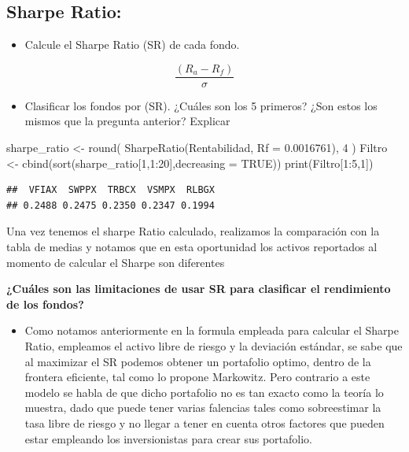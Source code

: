 \documentclass[
  12pt,
]{article}
\newenvironment{Shaded}{\begin{snugshade}}{\end{snugshade}}
\newcommand{\AttributeTok}[1]{\textcolor[rgb]{0.77,0.63,0.00}{#1}}
\newcommand{\ConstantTok}[1]{\textcolor[rgb]{0.00,0.00,0.00}{#1}}
\newcommand{\DecValTok}[1]{\textcolor[rgb]{0.00,0.00,0.81}{#1}}
\newcommand{\FloatTok}[1]{\textcolor[rgb]{0.00,0.00,0.81}{#1}}
\newcommand{\FunctionTok}[1]{\textcolor[rgb]{0.00,0.00,0.00}{#1}}
\newcommand{\NormalTok}[1]{#1}
\newcommand{\OtherTok}[1]{\textcolor[rgb]{0.56,0.35,0.01}{#1}}
\newcommand{\SpecialCharTok}[1]{\textcolor[rgb]{0.00,0.00,0.00}{#1}}
\providecommand{\tightlist}{%
  \setlength{\itemsep}{0pt}\setlength{\parskip}{0pt}}
\begin{document}
\hypertarget{sharpe-ratio}{%
\subsection{Sharpe Ratio:}\label{sharpe-ratio}}

\begin{itemize}
\tightlist
\item
  Calcule el Sharpe Ratio (SR) de cada fondo.
\end{itemize}

\[
\frac{(R_{a}-R_{f})}{\sigma }
\]

\begin{itemize}
\tightlist
\item
  Clasificar los fondos por (SR). ¿Cuáles son los 5 primeros? ¿Son estos
  los mismos que la pregunta anterior? Explicar
\end{itemize}

\begin{Shaded}
\begin{Highlighting}[]
\NormalTok{sharpe\_ratio }\OtherTok{\textless{}{-}} \FunctionTok{round}\NormalTok{(}
  \FunctionTok{SharpeRatio}\NormalTok{(Rentabilidad, }\AttributeTok{Rf =} \FloatTok{0.0016761}\NormalTok{), }\DecValTok{4}
\NormalTok{)}
\NormalTok{Filtro }\OtherTok{\textless{}{-}} \FunctionTok{cbind}\NormalTok{(}\FunctionTok{sort}\NormalTok{(sharpe\_ratio[}\DecValTok{1}\NormalTok{,}\DecValTok{1}\SpecialCharTok{:}\DecValTok{20}\NormalTok{],}\AttributeTok{decreasing =} \ConstantTok{TRUE}\NormalTok{))}
\FunctionTok{print}\NormalTok{(Filtro[}\DecValTok{1}\SpecialCharTok{:}\DecValTok{5}\NormalTok{,}\DecValTok{1}\NormalTok{])}
\end{Highlighting}
\end{Shaded}

\begin{verbatim}
##  VFIAX  SWPPX  TRBCX  VSMPX  RLBGX 
## 0.2488 0.2475 0.2350 0.2347 0.1994
\end{verbatim}

Una vez tenemos el sharpe Ratio calculado, realizamos la comparación con
la tabla de medias y notamos que en esta oportunidad los activos
reportados al momento de calcular el Sharpe son diferentes

\textbf{¿Cuáles son las limitaciones de usar SR para clasificar el
rendimiento de los fondos?}

\begin{itemize}
\tightlist
\item
  Como notamos anteriormente en la formula empleada para calcular el
  Sharpe Ratio, empleamos el activo libre de riesgo y la deviación
  estándar, se sabe que al maximizar el SR podemos obtener un portafolio
  optimo, dentro de la frontera eficiente, tal como lo propone
  Markowitz. Pero contrario a este modelo se habla de que dicho
  portafolio no es tan exacto como la teoría lo muestra, dado que puede
  tener varias falencias tales como sobreestimar la tasa libre de riesgo
  y no llegar a tener en cuenta otros factores que pueden estar
  empleando los inversionistas para crear sus portafolio.
\end{itemize}
\end{document}

